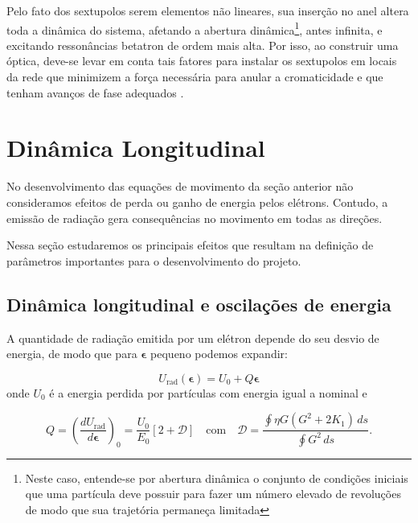 Pelo fato dos sextupolos serem elementos não lineares, sua inserção no anel altera toda a dinâmica do sistema, afetando a abertura dinâmica\footnote{Neste caso, entende-se por abertura dinâmica o conjunto de condições iniciais que uma partícula deve possuir para fazer um número elevado de revoluções de modo que sua trajetória permaneça limitada}, antes infinita, e excitando ressonâncias betatron de ordem mais alta. Por isso, ao construir uma óptica, deve-se levar em conta tais fatores para instalar os sextupolos em locais da rede que minimizem a força necessária para anular a cromaticidade e que tenham avanços de fase adequados \cite{Huth}.


\section{Dinâmica Longitudinal}

No desenvolvimento das equações de movimento da seção anterior não consideramos efeitos de perda ou ganho de energia pelos elétrons. Contudo, a emissão de radiação gera consequências no movimento em todas as direções.

Nessa seção estudaremos os principais efeitos que resultam na definição de parâmetros importantes para o desenvolvimento do projeto.

\subsection{Dinâmica longitudinal e oscilações de energia}

A quantidade de radiação emitida por um elétron depende do seu desvio de energia, de modo que para $\boldsymbol{\epsilon}$ pequeno podemos expandir:

\begin{equation}
 U_{\mathrm{rad}}(\boldsymbol{\epsilon}) = U_0 + Q \boldsymbol{\epsilon}
\end{equation}
onde $U_0$ é a energia perdida por partículas com energia igual a nominal e \cite{Sands}

\begin{equation}
 Q=\left(\frac{d U_\mathrm{rad}}{d \boldsymbol{\epsilon}}\right)_0 =
\frac{U_0}{E_0}\left[2+\mathcal{D}\right]\quad \text{com} \quad\mathcal{D} =
\frac{\oint \eta G(G^2+2 K_1) \, ds}{\oint G^2\,ds}.
\end{equation}

